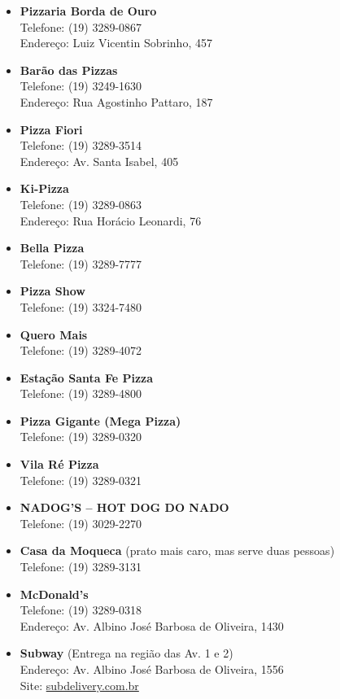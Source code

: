 \begin{itemize}
\item   \textbf{Pizzaria Borda de Ouro}
        \\Telefone: (19) 3289-0867
        \\Endereço: Luiz Vicentin Sobrinho, 457

\item   \textbf{Barão das Pizzas}
        \\Telefone: (19) 3249-1630
        \\Endereço: Rua Agostinho Pattaro, 187

\item   \textbf{Pizza Fiori}
        \\Telefone: (19) 3289-3514
        \\Endereço: Av. Santa Isabel, 405

\item   \textbf{Ki-Pizza}
        \\Telefone: (19) 3289-0863
        \\Endereço: Rua Horácio Leonardi, 76

\item   \textbf{Bella Pizza}
        \\Telefone: (19) 3289-7777

\item   \textbf{Pizza Show}
        \\Telefone: (19) 3324-7480

\item   \textbf{Quero Mais}
        \\Telefone: (19) 3289-4072

\item   \textbf{Estação Santa Fe Pizza}
        \\Telefone: (19) 3289-4800

\item   \textbf{Pizza Gigante (Mega Pizza)}
        \\Telefone: (19) 3289-0320

\item   \textbf{Vila Ré Pizza}
        \\Telefone: (19) 3289-0321

\item   \textbf{NADOG'S -- HOT DOG DO NADO}
        \\Telefone: (19) 3029-2270

\item   \textbf{Casa da Moqueca} (prato mais caro, mas serve duas pessoas)
        \\Telefone: (19) 3289-3131

\item   \textbf{McDonald's}
        \\Telefone: (19) 3289-0318
        \\Endereço: Av. Albino José Barbosa de Oliveira, 1430

\item   \textbf{Subway} (Entrega na região das Av. 1 e 2)
        \\Endereço: Av. Albino José Barbosa de Oliveira, 1556
        \\Site: \url{subdelivery.com.br}
\end{itemize}

